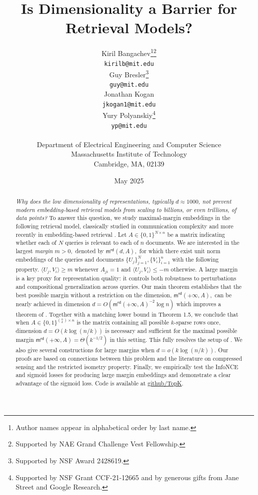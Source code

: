 \documentclass[preprint]{article}
\title{Is Dimensionality a Barrier for Retrieval Models?}
\author{%
  Kiril Bangachev\thanks{Author names appear in alphabetical order by last name.}\thanks{Supported by NAE Grand Challenge Vest Fellowship.} \\
  \texttt{kirilb@mit.edu} \\
  \And 
  Guy Bresler\thanks{Supported by NSF Award 2428619.}\\
  \texttt{guy@mit.edu}\\
  \And
  Jonathan Kogan\\ \texttt{jkogan1@mit.edu} \\
  \And
  Yury Polyanskiy\thanks{Supported by NSF Grant CCF-21-12665 and by generous gifts from Jane Street and Google Research.}\\
  \texttt{yp@mit.edu}\\ \\
  Department of Electrical Engineering and Computer Science\\
  Massachusetts Institute of Technology\\
  Cambridge, MA, 02139 \\}
\date{May 2025}
\newcommand{\nbyp}[1]{{\color{red}\textsf{[YP: #1]}}}
\def\nbyp#1{{\color{red}\textbf{YP:}#1]}}
\begin{document}
\maketitle

\begin{abstract}
\textit{Why does the low dimensionality of representations, typically $d\approx 1000$, not prevent modern embedding-based retrieval models from scaling to billions, or even trillions, of data points?}
To answer this question, we study maximal-margin embeddings in the following retrieval model, classically studied in communication complexity \cite{paturi1986probabilistic} and more recently in embedding-based retrieval \cite{weller2025theoretical}.
Let $A\in \{0,1\}^{N\times n}$ be a matrix indicating whether each of $N$ queries is relevant to each of $n$ documents. We are interested in the largest \textit{margin} $m>0,$ denoted by $\mathsf{m}^{\mathsf{rd}}(d, A),$ for which there exist unit norm embeddings of the queries and documents $\{U_j\}_{j = 1}^N, \{V_i\}_{i = 1}^n$ with the following property. $\langle U_j, V_i\rangle \ge m$ whenever $A_{ji} = 1$ and $\langle U_j, V_i\rangle \le -m$ otherwise. A large margin is a key proxy for representation quality: it controls both robustness to perturbations and compositional generalization across queries. Our main theorem establishes that the best possible margin without a restriction on the dimension, $\mathsf{m}^{\mathsf{rd}}(+\infty, A),$ can be nearly achieved in dimension $d = O(\mathsf{m}^{\mathsf{rd}}(+\infty, A)^{-2}\log n)$ which improves a theorem of \cite{ben2002limitations}. Together with a matching lower bound in Theorem 1.5, we conclude that when $A\in \{0,1\}^{\binom{n}{k}\times n}$ is the matrix containing all possible $k$-sparse rows once, dimension $d = O(k\log (n/k))$ is necessary and sufficient for the maximal possible margin $\mathsf{m}^{\mathsf{rd}}(+\infty, A) = \Theta(k^{-1/2})$ in this setting. This fully resolves the setup of \cite{weller2025theoretical}. We also give several constructions for large margins when $d = o(k\log (n/k)).$ Our proofs are based on connections between this problem and the literature on compressed sensing and the restricted isometry property. Finally, we empirically test the InfoNCE and sigmoid losses for producing large margin embeddings and demonstrate a clear advantage of the sigmoid loss. Code is available at \href{https://github.com/BangachevKiril/TopK}{github/TopK}.
\end{abstract}
\end{document}

